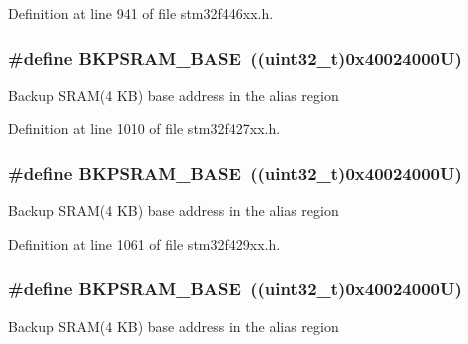 Definition at line 941 of file stm32f446xx.\+h.

\subsubsection[{\texorpdfstring{B\+K\+P\+S\+R\+A\+M\+\_\+\+B\+A\+SE}{BKPSRAM_BASE}}]{\setlength{\rightskip}{0pt plus 5cm}\#define B\+K\+P\+S\+R\+A\+M\+\_\+\+B\+A\+SE~((uint32\+\_\+t)0x40024000\+U)}\hypertarget{group___peripheral__memory__map_ga52e57051bdf8909222b36e5408a48f32}{}\label{group___peripheral__memory__map_ga52e57051bdf8909222b36e5408a48f32}
Backup S\+R\+A\+M(4 K\+B) base address in the alias region 

Definition at line 1010 of file stm32f427xx.\+h.

\subsubsection[{\texorpdfstring{B\+K\+P\+S\+R\+A\+M\+\_\+\+B\+A\+SE}{BKPSRAM_BASE}}]{\setlength{\rightskip}{0pt plus 5cm}\#define B\+K\+P\+S\+R\+A\+M\+\_\+\+B\+A\+SE~((uint32\+\_\+t)0x40024000\+U)}\hypertarget{group___peripheral__memory__map_ga52e57051bdf8909222b36e5408a48f32}{}\label{group___peripheral__memory__map_ga52e57051bdf8909222b36e5408a48f32}
Backup S\+R\+A\+M(4 K\+B) base address in the alias region 

Definition at line 1061 of file stm32f429xx.\+h.

\subsubsection[{\texorpdfstring{B\+K\+P\+S\+R\+A\+M\+\_\+\+B\+A\+SE}{BKPSRAM_BASE}}]{\setlength{\rightskip}{0pt plus 5cm}\#define B\+K\+P\+S\+R\+A\+M\+\_\+\+B\+A\+SE~((uint32\+\_\+t)0x40024000\+U)}\hypertarget{group___peripheral__memory__map_ga52e57051bdf8909222b36e5408a48f32}{}\label{group___peripheral__memory__map_ga52e57051bdf8909222b36e5408a48f32}
Backup S\+R\+A\+M(4 K\+B) base address in the alias region 

